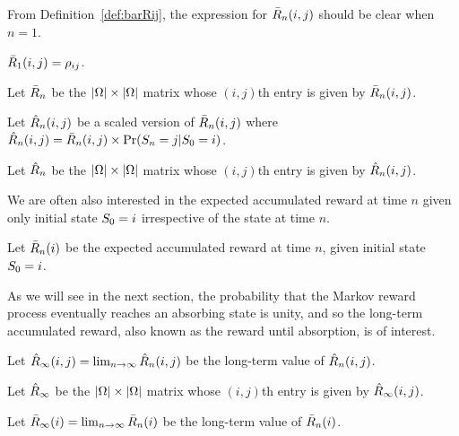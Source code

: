 From Definition~\ref{def:barRij}, the expression for $\bar{R}_{n}(i, j)$ should be clear when $n = 1$.

\begin{mycor}
	\label{cor:barR1}
	$\bar{R}_{1}(i, j) = \rho_{ij}$.
\end{mycor}

\begin{mydef}
	Let $\bar{R}_{n}$ be the $|\Omega| \times |\Omega|$ matrix whose $(i, j)$th entry is given by $\bar{R}_{n}(i, j)$.
\end{mydef}

\begin{mydef}
	\label{def:hatRij}
	Let $\hat{R}_{n}(i, j)$ be a scaled version of $\bar{R}_{n}(i, j)$ where $\hat{R}_{n}(i, j) = \bar{R}_{n}(i, j) \times \operatorname{Pr}(S_{n} = j | S_{0} = i)$.
\end{mydef}

\begin{mydef}
\label{def:hatR}
	Let $\hat{R}_{n}$ be the $|\Omega| \times |\Omega|$ matrix whose $(i, j)$th entry is given by $\hat{R}_{n}(i, j)$.
\end{mydef}


We are often also interested in the expected accumulated reward at time $n$ given only initial state $S_{0} = i$ irrespective of the state at time $n$.

\begin{mydef}
\label{def:barRi}
	Let $\bar{R}_{n}(i)$ be the expected accumulated reward at time $n$, given initial state $S_{0} = i$.
\end{mydef}

As we will see in the next section, the probability that the Markov reward process eventually reaches an absorbing state is unity, and so the long-term accumulated reward, also known as the reward until absorption, is of interest.

\begin{mydef}
\label{def:hatRinfij}
	Let $\hat{R}_{\infty}(i, j) = \lim_{n \to \infty} \hat{R}_{n}(i, j)$ be the long-term value of $\hat{R}_{n}(i, j)$.
\end{mydef}

\begin{mydef}
\label{def:hatRinf}
	Let $\hat{R}_{\infty}$ be the $|\Omega| \times |\Omega|$ matrix whose $(i, j)$th entry is given by $\hat{R}_{\infty}(i, j)$.
\end{mydef}

\begin{mydef}
\label{def:barRinfi}
	Let $\bar{R}_{\infty}(i) = \lim_{n \to \infty} \bar{R}_{n}(i)$ be the long-term value of $\bar{R}_{n}(i)$.
\end{mydef}

